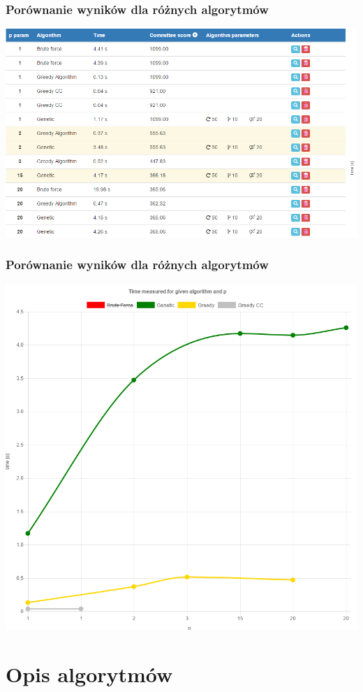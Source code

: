 \documentclass{beamer}
\begin{document}
\begin{frame}
\frametitle{Porównanie wyników dla różnych algorytmów}
\includegraphics[width=0.85\paperwidth]{pics/algorithms_comparison_table.png}
\end{frame}

\begin{frame}
\frametitle{Porównanie wyników dla różnych algorytmów}
\begin{center}
\includegraphics[width=0.5\paperwidth]{pics/p_t_chart.png}
\end{center}
\end{frame}


\section{Opis algorytmów}
\end{document}
